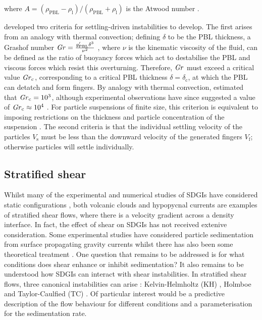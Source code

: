\documentclass[authoryear,preprint,review,12pt]{elsarticle}
\newcommand\Gr{\mbox{\textit{Gr}}} %
\begin{document}
where $A = (\rho_{\text{PBL}} - \rho_{\text{l}}) / (\rho_{\text{PBL}} + \rho_{\text{l}})$ is the Atwood number \citep{Sharp84}.

\citet{Hoyal99} developed two criteria for settling-driven instabilities to develop. The first arises from an analogy with thermal convection; defining $\delta$ to be the PBL thickness, a Grashof number $\Gr = \frac{g^{\prime}_{\text{PBL}} \delta^{3}}{\nu^{2}}$ \citep{Turner79}, where $\nu$ is the kinematic viscosity of the fluid, can be defined as the ratio of buoyancy forces which act to destabilise the PBL and viscous forces which resist this overturning. Therefore, $\Gr$ must exceed a critical value $\Gr_{\text{c}}$, corresponding to a critical PBL thickness $\delta = \delta_{\text{c}}$, at which the PBL can detatch and form fingers. By analogy with thermal convection, \citet{Hoyal99} estimated that $\Gr_{\text{c}} = 10^{3}$, although experimental observations have since suggested a value of $\Gr_{\text{c}} \approx 10^{4}$ \citep{Fries21}. For particle suspensions of finite size, this criterion is equivalent to imposing restrictions on the thickness and particle concentration of the suspension \citep{Fries21}. The second criteria is that the individual settling velocity of the particles $V_{\text{s}}$ must be less than the downward velocity of the generated fingers $V_{\text{f}}$; otherwise particles will settle individually. 

\subsection{Stratified shear}
\label{subsec:strat_shear}

Whilst many of the experimental and numerical studies of SDGIs have considered static configurations \citep{Chen97, Hoyal99, Blanchette05, Yu14, Burns15, Manzella15, Rouhnia15, Jazi16, Scollo17}, both volcanic clouds and hypopycnal currents are examples of stratified shear flows, where there is a velocity gradient across a density interface. In fact, the effect of shear on SDGIs has not received extenive consideration. Some experimental studies have considered particle sedimentation from surface propagating gravity currents \citep{Maxworthy99, Parsons01, McCool04, Sutherland18, Jazi19} whilst there has also been some theoretical treatment \citep{Farenzena17, Konopliv18}. One question that remains to be addressed is for what conditions does shear enhance or inhibit sedimentation? It also remains to be understood how SDGIs can interact with shear instabilities. In stratified shear flows, three canonical instabilities can arise \citep{Eaves19}: Kelvin-Helmholtz (KH) \citep{Helmholtz68, Kelvin71, Jarvis21}, Holmboe \citep{Holmboe62} and Taylor-Caulfied (TC) \citep{Taylor31, Caulfield95}. Of particular interest would be a predictive description of the flow behaviour for different conditions and a parameterisation for the sedimentation rate.
\end{document}
